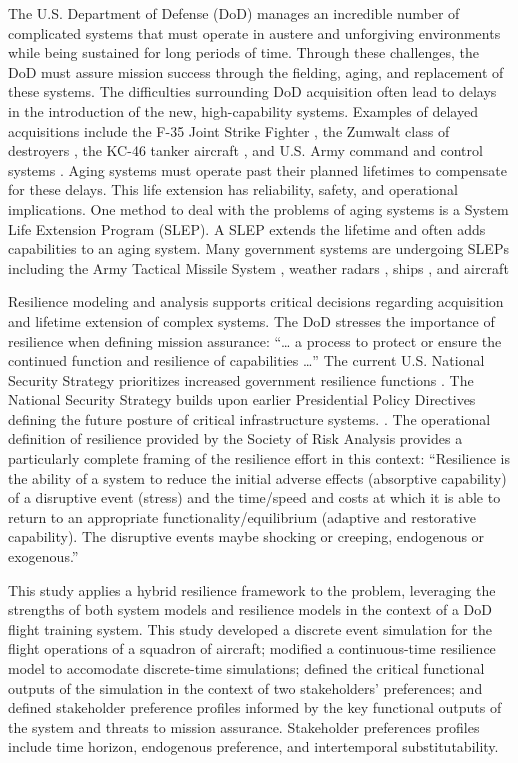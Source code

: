 \documentclass[preprint,12pt]{elsarticle}
\begin{document}
The U.S. Department of Defense (DoD) manages an incredible number of
complicated systems that must operate in austere and unforgiving
environments while being sustained for long periods of time.  Through
these challenges, the DoD must assure mission success through the
fielding, aging, and replacement of these systems.  The difficulties
surrounding DoD acquisition often lead to delays in the introduction
of the new, high-capability systems. Examples of delayed acquisitions
include the F-35 Joint Strike Fighter \cite{Werner2018}, the Zumwalt
class of destroyers \cite{Katz2018}, the KC-46 tanker aircraft
\cite{Mehta2016}, and U.S. Army command and control systems
\citep{Edwards2017}.  Aging systems must operate past their planned
lifetimes to compensate for these delays. This life extension has
reliability, safety, and operational implications. One method to deal
with the problems of aging systems is a System Life Extension Program
(SLEP). A SLEP extends the lifetime and often adds capabilities to an
aging system. Many government systems are undergoing SLEPs including
the Army Tactical Missile System \cite{DOTE2017,zacks2015}, weather
radars \cite{ROC2018}, ships \cite{eckstein2018,NAVSEA2018}, and
aircraft \cite{Lockheed2017,Garbarino2018,Tirpak2015,jennings2018}

Resilience modeling and analysis supports critical decisions regarding acquisition
and lifetime extension of complex systems. The DoD stresses
the importance of resilience when defining mission assurance: ``\ldots
a process to protect or ensure the continued function and resilience
of capabilities \ldots'' \cite{DepartmentofDefense2016a} The current
U.S. National Security Strategy prioritizes increased government
resilience functions \cite{Trump2017}. The National Security Strategy
builds upon earlier Presidential Policy Directives defining the future
posture of critical infrastructure systems. \cite{PPD8,PPD21}. The
operational definition of resilience provided by the Society of Risk
Analysis provides a particularly complete framing of the resilience
effort in this context: ``Resilience is the ability of
a system to reduce the initial adverse effects (absorptive capability)
of a disruptive event (stress) and the time/speed and costs at which
it is able to return to an appropriate functionality/equilibrium
(adaptive and restorative capability). The disruptive events maybe
shocking or creeping, endogenous or exogenous.'' \cite{SRA2016}

This study applies a hybrid resilience framework to the problem,
leveraging the strengths of both system models and resilience models
in the context of a DoD flight training system. This study developed a
discrete event simulation for the flight operations of a squadron of
aircraft; modified a continuous-time resilience model
\cite{emanuel2018,emanuel2019} to accomodate discrete-time
simulations; defined the critical functional outputs of the simulation
in the context of two stakeholders' preferences; and defined
stakeholder preference profiles informed by the key functional outputs
of the system and threats to mission assurance. Stakeholder
preferences profiles include time horizon, endogenous preference, and
intertemporal substitutability.
\end{document}
